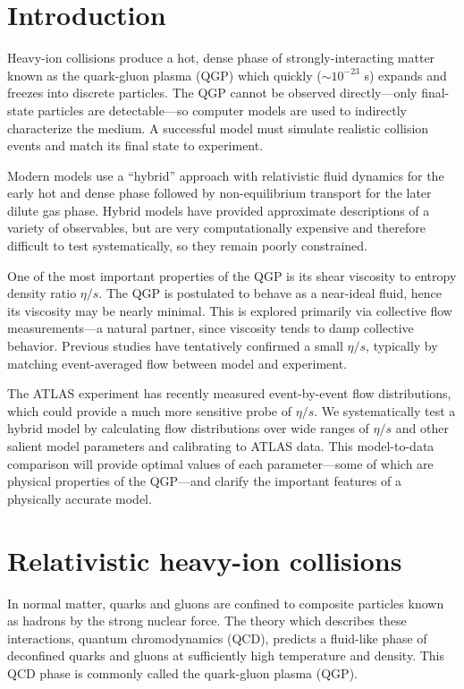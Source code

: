 \documentclass[reprint,amsmath]{revtex4-1}
\begin{document}
\section{Introduction}


Heavy-ion collisions produce a hot, dense phase of strongly-interacting matter known as the quark-gluon plasma (QGP) which quickly
(${\sim}10^{-23}$ s) expands and freezes into discrete particles.  The QGP cannot be observed directly---only final-state particles are
detectable---so computer models are used to indirectly characterize the medium.  A successful model must simulate realistic collision events
and match its final state to experiment.

Modern models use a ``hybrid'' approach with relativistic fluid dynamics for the early hot and dense phase followed by non-equilibrium
transport for the later dilute gas phase.  Hybrid models have provided approximate descriptions of a variety of observables, but are
very computationally expensive and therefore difficult to test systematically, so they remain poorly constrained.

One of the most important properties of the QGP is its shear viscosity to entropy density ratio $\eta/s$.  The QGP is postulated to behave
as a near-ideal fluid, hence its viscosity may be nearly minimal.  This is explored primarily via collective flow measurements---a natural
partner, since viscosity tends to damp collective behavior.  Previous studies have tentatively confirmed a small $\eta/s$, typically by
matching event-averaged flow between model and experiment.

The ATLAS experiment has recently measured event-by-event flow distributions, which could provide a much more sensitive probe of $\eta/s$.
We systematically test a hybrid model by calculating flow distributions over wide ranges of $\eta/s$ and other salient model parameters and
calibrating to ATLAS data.  This model-to-data comparison will provide optimal values of each parameter---some of which are physical
properties of the QGP---and clarify the important features of a physically accurate model.





\section{Relativistic heavy-ion collisions}


In normal matter, quarks and gluons are confined to composite particles known as hadrons by the strong nuclear force.
The theory which describes these interactions, quantum chromodynamics (QCD), predicts a fluid-like phase of deconfined quarks and gluons at
sufficiently high temperature and density.  This QCD phase is commonly called the quark-gluon plasma (QGP).
\end{document}
